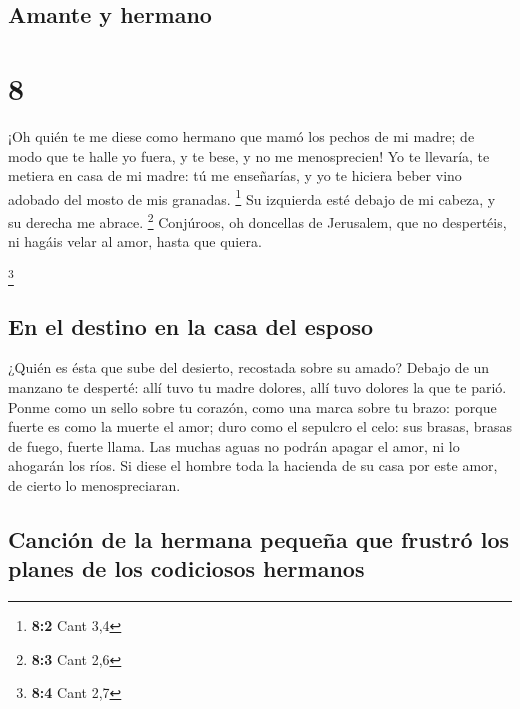 \hypertarget{amante-y-hermano}{%
\subsection{Amante y hermano}\label{amante-y-hermano}}

\hypertarget{section-7}{%
\section{8}\label{section-7}}

 ¡Oh quién te me diese como hermano que mamó los pechos de
mi madre; de modo que te halle yo fuera, y te bese, y no me
menosprecien!  Yo te llevaría, te metiera en casa de mi
madre: tú me enseñarías, y yo te hiciera beber vino adobado del mosto de
mis granadas. \footnote{\textbf{8:2} Cant 3,4}  Su
izquierda esté debajo de mi cabeza, y su derecha me abrace. \footnote{\textbf{8:3}
  Cant 2,6}  Conjúroos, oh doncellas de Jerusalem, que no
despertéis, ni hagáis velar al amor, hasta que quiera.

\footnote{\textbf{8:4} Cant 2,7}

\hypertarget{en-el-destino-en-la-casa-del-esposo}{%
\subsection{En el destino en la casa del
esposo}\label{en-el-destino-en-la-casa-del-esposo}}

 ¿Quién es ésta que sube del desierto, recostada sobre su
amado? Debajo de un manzano te desperté: allí tuvo tu madre dolores,
allí tuvo dolores la que te parió.  Ponme como un sello
sobre tu corazón, como una marca sobre tu brazo: porque fuerte es como
la muerte el amor; duro como el sepulcro el celo: sus brasas, brasas de
fuego, fuerte llama.  Las muchas aguas no podrán apagar el
amor, ni lo ahogarán los ríos. Si diese el hombre toda la hacienda de su
casa por este amor, de cierto lo menospreciaran.

\hypertarget{canciuxf3n-de-la-hermana-pequeuxf1a-que-frustruxf3-los-planes-de-los-codiciosos-hermanos}{%
\subsection{Canción de la hermana pequeña que frustró los planes de los
codiciosos
hermanos}\label{canciuxf3n-de-la-hermana-pequeuxf1a-que-frustruxf3-los-planes-de-los-codiciosos-hermanos}}

